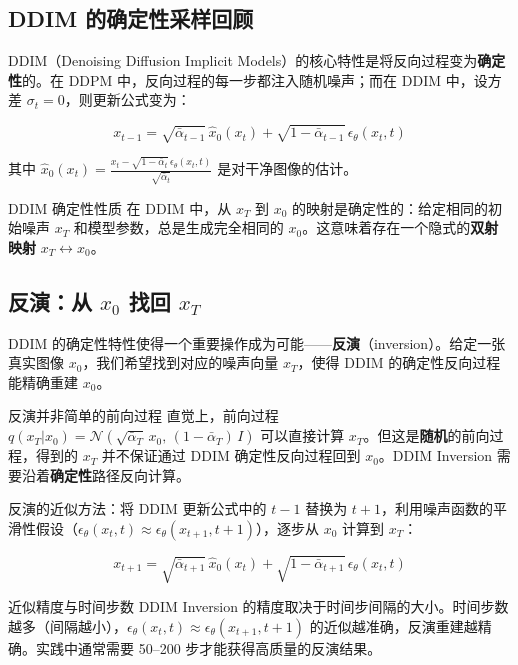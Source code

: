 \documentclass[a4paper]{article}
\begin{document}
\subsection{DDIM 的确定性采样回顾}

DDIM（Denoising Diffusion Implicit Models）的核心特性是将反向过程变为\textbf{确定性}的。在 DDPM 中，反向过程的每一步都注入随机噪声；而在 DDIM 中，设方差 $\sigma_t = 0$，则更新公式变为：

$$
x_{t-1} = \sqrt{\bar\alpha_{t-1}}\,\hat{x}_0(x_t) + \sqrt{1-\bar\alpha_{t-1}}\,\epsilon_\theta(x_t, t)
$$

其中 $\hat{x}_0(x_t) = \frac{x_t - \sqrt{1-\bar\alpha_t}\,\epsilon_\theta(x_t, t)}{\sqrt{\bar\alpha_t}}$ 是对干净图像的估计。

\begin{importantbox}{DDIM 确定性性质}
在 DDIM 中，从 $x_T$ 到 $x_0$ 的映射是确定性的：给定相同的初始噪声 $x_T$ 和模型参数，总是生成完全相同的 $x_0$。这意味着存在一个隐式的\textbf{双射映射} $x_T \leftrightarrow x_0$。
\end{importantbox}

\subsection{反演：从 $x_0$ 找回 $x_T$}

DDIM 的确定性特性使得一个重要操作成为可能——\textbf{反演}（inversion）。给定一张真实图像 $x_0$，我们希望找到对应的噪声向量 $x_T$，使得 DDIM 的确定性反向过程能精确重建 $x_0$。

\begin{warningbox}{反演并非简单的前向过程}
直觉上，前向过程 $q(x_T|x_0) = \mathcal{N}(\sqrt{\bar\alpha_T}\,x_0,\, (1-\bar\alpha_T)\,I)$ 可以直接计算 $x_T$。但这是\textbf{随机}的前向过程，得到的 $x_T$ 并不保证通过 DDIM 确定性反向过程回到 $x_0$。DDIM Inversion 需要沿着\textbf{确定性}路径反向计算。
\end{warningbox}

反演的近似方法：将 DDIM 更新公式中的 $t-1$ 替换为 $t+1$，利用噪声函数的平滑性假设（$\epsilon_\theta(x_t, t) \approx \epsilon_\theta(x_{t+1}, t+1)$），逐步从 $x_0$ 计算到 $x_T$：

$$
x_{t+1} = \sqrt{\bar\alpha_{t+1}}\,\hat{x}_0(x_t) + \sqrt{1-\bar\alpha_{t+1}}\,\epsilon_\theta(x_t, t)
$$

\begin{knowledgebox}{近似精度与时间步数}
DDIM Inversion 的精度取决于时间步间隔的大小。时间步数越多（间隔越小），$\epsilon_\theta(x_t, t) \approx \epsilon_\theta(x_{t+1}, t+1)$ 的近似越准确，反演重建越精确。实践中通常需要 50--200 步才能获得高质量的反演结果。
\end{knowledgebox}
\end{document}
